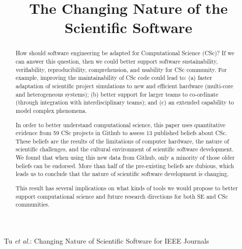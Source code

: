 \documentclass[conference,10pt]{IEEEtran}
\begin{document}
\title{\vspace{-10pt} The Changing Nature of the Scientific Software \vspace{-5pt}}
\author{ }





%
{Tu \MakeLowercase{\textit{et al.}}: Changing Nature of Scientific Software for IEEE Journals}

\maketitle
\thispagestyle{plain}
\pagestyle{plain}
\IEEEpeerreviewmaketitle

\begin{abstract}
How should software engineering be adapted for Computational Science (CSc)? If we can answer this question, then we could better support software sustainability, verifiability, reproducibility, comprehension, and usability for CSc community. For example, improving the maintainability of CSc code could lead to: (a) faster adaptation of scientific project simulations to new and efficient hardware (multi-core and heterogeneous systems); (b) better support  for larger teams to co-ordinate (through integration with interdisciplinary teams); and (c) an extended capability to  model complex phenomena. 

In order to better understand computational science, this paper uses quantitative evidence from 59 CSc projects in Github to assess 13 published beliefs about CSc. These beliefs are the results of the limitations of computer hardware, the nature of scientific challenges, and the cultural environment of scientific software development. We found that when using this new data from Github, only a minority of those older beliefs can be endorsed. More than half of the pre-existing beliefs are dubious, which leads us to conclude that the nature of scientific software development is changing. 

This result has several implications on what kinds of tools we would propose to better support computational science and future research directions for both SE and CSc communities.

\end{abstract}
\end{document}
